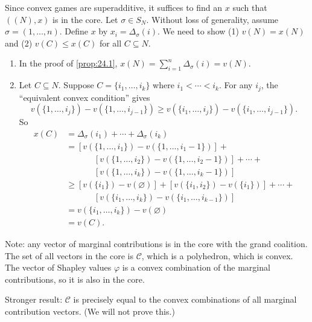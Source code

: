 \documentclass[12pt,letterpaper]{report}
\begin{document}
\begin{thmproof}
  Since convex games are superadditive, it suffices to find an $x$ such that $((N), x)$ is in the
  core.
  Let $\sigma \in S_N$.
  Without loss of generality, assume $\sigma = (1, \ldots, n)$.
  Define $x$ by $x_i = \Delta_\sigma(i)$.
  We need to show (1) $v(N) = x(N)$ and (2) $v(C) \leq x(C)$ for all $C \subseteq N$.
  \begin{enumerate}[label=(\arabic*)]
    \item
    In the proof of \cref{prop:24.1}, $x(N) = \sum\limits_{i = 1}^n \Delta_\sigma(i) = v(N)$.
    \item
    Let $C \subseteq N$.
    Suppose $C = \{i_1, \ldots, i_k\}$ where $i_1 < \cdots < i_k$.
    For any $i_j$, the ``equivalent convex condition'' gives
    \[
      v(\{1, \ldots, i_j\}) - v(\{1, \ldots, i_{j - 1}\}) \geq
        v(\{i_1, \ldots, i_j\}) - v(\{i_1, \ldots, i_{j - 1}\}).
    \]
    So
    \begin{align*}
      x(C) &= \Delta_\sigma(i_1) + \cdots + \Delta_\sigma(i_k) \\
      &= [ v(\{1, \ldots, i_1\}) - v(\{1, \ldots, i_1 - 1\}) ] +{} \\
      &\phantom{{}={}} \qquad
        [ v(\{1, \ldots, i_2\}) - v(\{1, \ldots, i_2 - 1\}) ] + \cdots +{} \\
      &\phantom{{}={}} \qquad
        [ v(\{1, \ldots, i_k\}) - v(\{1, \ldots, i_k - 1\}) ] \\
      &\geq [ v(\{i_1\}) - v(\varnothing) ] + [ v(\{i_1, i_2\}) - v(\{i_1\}) ] + \cdots +{} \\
      &\phantom{{}={}} \qquad
        [ v(\{i_1, \ldots, i_k\}) - v(\{i_1, \ldots, i_{k - 1}\}) ] \\
      &= v(\{i_1, \ldots, i_k\}) - v(\varnothing) \\
      &= v(C).
    \end{align*}
  \end{enumerate}
\end{thmproof}

Note: any vector of marginal contributions is in the core with the grand coalition.
The set of all vectors in the core is $\mathcal{C}$, which is a polyhedron, which is convex.
The vector of Shapley values $\varphi$ is a convex combination of the marginal contributions, so it
is also in the core.

Stronger result: $\mathcal{C}$ is precisely equal to the convex combinations of all marginal
contribution vectors.
(We will not prove this.)
\end{document}
